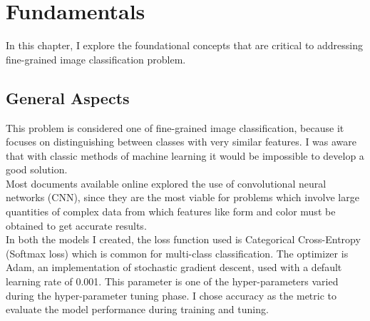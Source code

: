 \chapter{Fundamentals}
\label{ch:method} %
In this chapter, I explore the foundational concepts that are critical to addressing fine-grained image classification problem.

\section{ General Aspects}
This problem is considered one of fine-grained image classification, because it focuses on distinguishing between classes with very similar features. I was aware that with classic methods of machine learning it would be impossible to develop a good solution.\\[0.2cm]
\noindent
Most documents available online explored the use of convolutional neural networks (CNN), since they are the most viable for problems which involve large quantities of complex data from which features like form and color must be obtained to get accurate results.\\[0.2cm]
\noindent
In both the models I created, the loss function used is Categorical Cross-Entropy (Softmax loss) which is common for multi-class classification. The optimizer is Adam, an implementation of stochastic gradient descent, used with a default learning rate of 0.001. This parameter is one of the hyper-parameters varied during the hyper-parameter tuning phase. I chose accuracy as the metric to evaluate the model performance during training and tuning.\\

